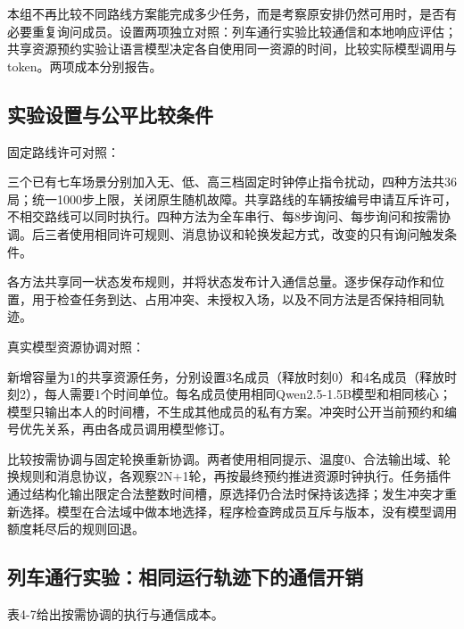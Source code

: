 本组不再比较不同路线方案能完成多少任务，而是考察原安排仍然可用时，是否有必要重复询问成员。设置两项独立对照：列车通行实验比较通信和本地响应评估；共享资源预约实验让语言模型决定各自使用同一资源的时间，比较实际模型调用与token。两项成本分别报告。

\hypertarget{ux5b9eux9a8cux8bbeux7f6eux4e0eux516cux5e73ux6bd4ux8f83ux6761ux4ef6}{%
\subsection{实验设置与公平比较条件}\label{ux5b9eux9a8cux8bbeux7f6eux4e0eux516cux5e73ux6bd4ux8f83ux6761ux4ef6}}

固定路线许可对照：

三个已有七车场景分别加入无、低、高三档固定时钟停止指令扰动，四种方法共36局；统一1000步上限，关闭原生随机故障。共享路线的车辆按编号申请互斥许可，不相交路线可以同时执行。四种方法为全车串行、每8步询问、每步询问和按需协调。后三者使用相同许可规则、消息协议和轮换发起方式，改变的只有询问触发条件。

各方法共享同一状态发布规则，并将状态发布计入通信总量。逐步保存动作和位置，用于检查任务到达、占用冲突、未授权入场，以及不同方法是否保持相同轨迹。

真实模型资源协调对照：

新增容量为1的共享资源任务，分别设置3名成员（释放时刻0）和4名成员（释放时刻2），每人需要1个时间单位。每名成员使用相同Qwen2.5-1.5B模型和相同核心；模型只输出本人的时间槽，不生成其他成员的私有方案。冲突时公开当前预约和编号优先关系，再由各成员调用模型修订。

比较按需协调与固定轮换重新协调。两者使用相同提示、温度0、合法输出域、轮换规则和消息协议，各观察2N+1轮，再按最终预约推进资源时钟执行。任务插件通过结构化输出限定合法整数时间槽，原选择仍合法时保持该选择；发生冲突才重新选择。模型在合法域中做本地选择，程序检查跨成员互斥与版本，没有模型调用额度耗尽后的规则回退。

\hypertarget{ux56faux5b9aux8defux7ebfux8bb8ux53efux4e0bux7684ux6267ux884cux4e0eux901aux4fe1ux6210ux672c}{%
\subsection{列车通行实验：相同运行轨迹下的通信开销}\label{ux56faux5b9aux8defux7ebfux8bb8ux53efux4e0bux7684ux6267ux884cux4e0eux901aux4fe1ux6210ux672c}}

表4-7给出按需协调的执行与通信成本。

